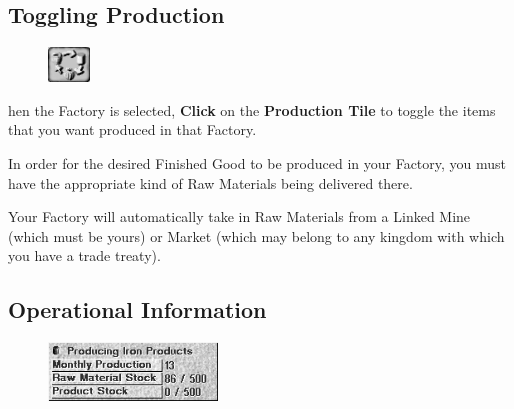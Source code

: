 \subsection{\textsf{Toggling Production}}


\begin{figure}
    \vspace{-20pt}
    \begin{center}
        \includegraphics[width=0.1\textwidth]{Tgoodcycling}
    \end{center}
    \vspace{-20pt}
\end{figure}


hen the Factory is selected, \textbf{Click} on the \textbf{Production Tile} to toggle the items that you want produced in that Factory.

In order for the desired Finished Good to be produced in your Factory, you must have the appropriate kind of Raw Materials being delivered there.

Your Factory will automatically take in Raw Materials from a Linked Mine (which must be yours) or Market (which may belong to any kingdom with which you have a trade treaty).

\subsection{\textsf{Operational Information}}


\begin{figure}
    \vspace{-20pt}
    \begin{center}
        \includegraphics[width=0.4\textwidth]{Ifactoryinfo} %
    \end{center}
    \vspace{-20pt}
\end{figure}

